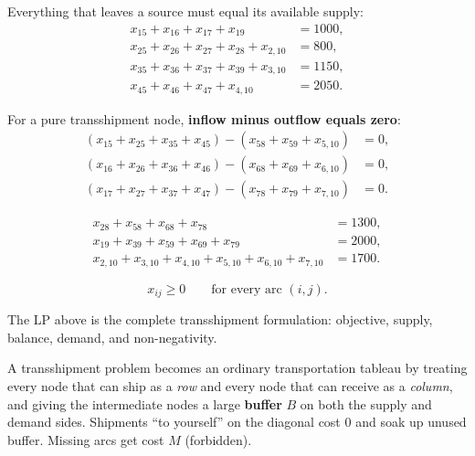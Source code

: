 Everything that leaves a source must equal its available supply:
\begin{align*}
  x_{15}+x_{16}+x_{17}+x_{19} &= 1000, \\
  x_{25}+x_{26}+x_{27}+x_{28}+x_{2,10} &= 800, \\
  x_{35}+x_{36}+x_{37}+x_{39}+x_{3,10} &= 1150, \\
  x_{45}+x_{46}+x_{47}+x_{4,10} &= 2050.
\end{align*}

For a pure transshipment node, \textbf{inflow minus outflow equals zero}:
\begin{align*}
  (x_{15}+x_{25}+x_{35}+x_{45})-(x_{58}+x_{59}+x_{5,10}) &= 0, \\
  (x_{16}+x_{26}+x_{36}+x_{46})-(x_{68}+x_{69}+x_{6,10}) &= 0, \\
  (x_{17}+x_{27}+x_{37}+x_{47})-(x_{78}+x_{79}+x_{7,10}) &= 0.
\end{align*}

\begin{align*}
  x_{28}+x_{58}+x_{68}+x_{78} &= 1300, \\
  x_{19}+x_{39}+x_{59}+x_{69}+x_{79} &= 2000, \\
  x_{2,10}+x_{3,10}+x_{4,10}+x_{5,10}+x_{6,10}+x_{7,10} &= 1700.
\end{align*}

\[
  x_{ij}\ge 0 \qquad\text{for every arc \((i,j)\)}.
\]

\begin{resultbox}[title={Part (a) --- model complete}]
The LP above is the complete transshipment formulation: objective, supply, balance,
demand, and non-negativity.
\end{resultbox}


\begin{ideabox}
A transshipment problem becomes an ordinary transportation tableau by treating every
node that can ship as a \emph{row} and every node that can receive as a \emph{column},
and giving the intermediate nodes a large \textbf{buffer} \(B\) on both the supply and
demand sides. Shipments ``to yourself'' on the diagonal cost \(0\) and soak up unused buffer.
Missing arcs get cost \(M\) (forbidden).
\end{ideabox}

